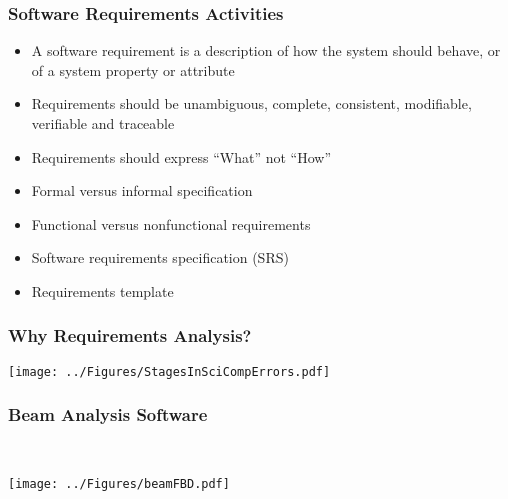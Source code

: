 \documentclass[t,12pt,numbers,fleqn]{beamer}
\begin{document}

\begin{frame}
\frametitle{Software Requirements Activities}
\begin{itemize}
\item A software requirement is a description of how the system should behave, or of a system property or attribute
\item Requirements should be unambiguous, complete, consistent, modifiable, verifiable and traceable
\item Requirements should express ``What'' not ``How''
\item Formal versus informal specification
\item Functional versus nonfunctional requirements
\item Software requirements specification (SRS)
\item Requirements template
\end{itemize}
\end{frame}


\begin{frame}
\frametitle{Why Requirements Analysis?}
\begin{center}
 \texttt{[image: ../Figures/StagesInSciCompErrors.pdf]}
\end{center}
\end{frame}


\begin{frame}
\frametitle{Beam Analysis Software}
~\newline
~\newline
\begin{center}
 \texttt{[image: ../Figures/beamFBD.pdf]}
\end{center}
\end{frame}

\end{document}
